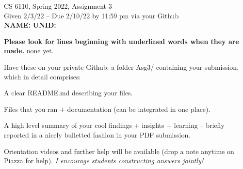\documentclass[11pt]{article}
\begin{document}

\newlength{\minpagw}
\settowidth{\minpagw}{\hspace{40em}}

\begin{center}
\begin{large}
  CS 6110, Spring 2022, Assignment 3  \\
  Given 2/3/22 -- Due 2/10/22 by 11:59 pm via your Github 
  \ \\
    {  {\Large\bf NAME: } \hfill {\Large\bf UNID: }\hspace{4cm} }
          \ \\
\end{large}

\end{center}

 {\bf Please look for lines beginning with underlined words when they are made.}
         {\tiny none yet.}

         Have these on your private Github:
         a folder Asg3/ containing your submission, which in detail comprises:
         \begin{compactitem}
         \item A clear README.md describing your files.
         \item Files that you ran + documentation (can be integrated in one place).
         \item A high level summary of your cool findings + insights + learning -- briefly reported in
           a nicely bulletted fashion in your PDF submission.
         \end{compactitem}

Orientation videos and further help will be available (drop a note anytime
on Piazza for help). {\em I encourage students constructing answers jointly!}
\end{document}
